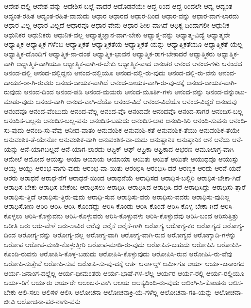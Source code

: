 {ಆದೇಶ-ದಲ್ಲಿ
ಆದೇಶ-ವನ್ನು
ಆದೇಶಿಸ-ಬಲ್ಲೆ-ವಾದರೆ
ಆದೊಡನೆಯೇ
ಆದ್ದ-ರಿಂದ
ಆದ್ದ-ರಿಂದಲೇ
ಆದ್ಯ
ಆದ್ಯಂತ
ಆದ್ಯಂತ-ರಹಿತ
ಆದ್ಯಂತ-ರಹಿತ-ವಾದುದು
ಆಧಾರ
ಆಧಾರದ
ಆಧಾರ-ದಿಂದ
ಆಧಾರ-ವನ್ನು
ಆಧಾರ-ವಾಗ-ಲಾರದು
ಆಧಾರ-ವಿಲ್ಲ
ಆಧಾರ-ವಿಲ್ಲದೆ
ಆಧಾರವೂ
ಆಧಾರ-ವೇನು
ಆಧಾರ-ಶೀಲ-ವಾಗಿದೆ
ಆಧಿಕ್ಯ-ದಿಂದಾಗಲೀ
ಆಧುನಿಕ
ಆಧುನಿಕರ
ಆಧುನಿಕರು
ಆಧುನಿಕ-ವಲ್ಲ
ಆಧ್ಯಾತ್ಮಜ್ಞಾನ-ವಾಗ-ಬೇಕು
ಆಧ್ಯಾತ್ಮ-ವನ್ನು
ಆಧ್ಯಾತ್ಮ-ವಿದ್ಯೆ
ಆಧ್ಯಾತ್ಮವೇ
ಆಧ್ಯಾತ್ಮಿಕ
ಆಧ್ಯಾತ್ಮಿಕ-ಗಳೆಂಬ
ಆಧ್ಯಾತ್ಮಿಕತೆ
ಆಧ್ಯಾತ್ಮಿಕತೆಯ
ಆಧ್ಯಾತ್ಮಿಕತೆ-ಯನ್ನು
ಆಧ್ಯಾತ್ಮಿಕತೆಯೂ
ಆಧ್ಯಾತ್ಮಿಕತೆ-ಯೆಲ್ಲ
ಆಧ್ಯಾತ್ಮಿಕ-ದೊಂದಿಗೆ
ಆಧ್ಯಾತ್ಮಿಕ-ನಾ-ದಂತೆ
ಆಧ್ಯಾತ್ಮಿಕ-ಭಾವನೆ
ಆಧ್ಯಾತ್ಮಿಕ-ರಾಗ-ಬೇಕಾದರೆ
ಆಧ್ಯಾತ್ಮಿಕರು
ಆಧ್ಯಾತ್ಮಿಕ-ವಾಗಿ
ಆಧ್ಯಾತ್ಮಿಕ-ವಾಗಿಯೂ
ಆಧ್ಯಾತ್ಮಿಕ-ವಾಗಿ-ರ-ಬೇಕು
ಆಧ್ಯಾತ್ಮಿಕ-ವಾದ
ಆನಂತರ
ಆನಂದ
ಆನಂದ-ಗಳು
ಆನಂದದ
ಆನಂದ-ದಲ್ಲಿ
ಆನಂದ-ದಲ್ಲಿದ್ದನು
ಆನಂದ-ದಲ್ಲಿಯೂ
ಆನಂದ-ದಲ್ಲಿ-ರು-ವುದು
ಆನಂದ-ದಲ್ಲಿ-ರು-ವೆನು
ಆನಂದ-ದಾಯಕ-ರಾ-ಗಿ-ರುವರು
ಆನಂದ-ದಾಯಕ-ವಾಗಿದೆ
ಆನಂದ-ದಾಯಕ-ವಾಗಿ-ರು-ವು-ದಕ್ಕೆ
ಆನಂದ-ದಾಯಕ-ವಾಗಿ-ರುವುದು
ಆನಂದ-ದಿಂದ
ಆನಂದ-ಪಡಿ
ಆನಂದ-ಮಯರು
ಆನಂದ-ಮೂರ್ತಿ-ಗಳು
ಆನಂದ-ವನ್ನು
ಆನಂದ-ವನ್ನುಂಟು-ಮಾಡು-ವುದು
ಆನಂದ-ವಾಗಿ
ಆನಂದ-ವಾಗಿ-ದೆಯೊ
ಆನಂದ-ವಿದೆ
ಆನಂದ-ವಿದೆಯೊ
ಆನಂದ-ವಿದ್ದರೆ
ಆನಂದವು
ಆನಂದವೂ
ಆನಂದ-ವೆಂಬುದು
ಆನಂದ-ವೆಲ್ಲ
ಆನಂದ-ವೊ
ಆನಂದವೇ
ಆನಂದವೊ
ಆನಂದ-ಸಾಗರ
ಆನಂದಿಸ-ಬಲ್ಲ
ಆನಂದಿಸ-ಬಲ್ಲನು
ಆನಂದಿಸ-ಬಲ್ಲ-ವನು
ಆನಂದಿಸ-ಬಹುದು
ಆನಂದಿಸ-ಲಾರ
ಆನಂದಿ-ಸಿರಿ
ಆನಂದಿ-ಸುವನು
ಆನಂದಿ-ಸು-ವುದು
ಆನಂದಿ-ಸು-ವೆವು
ಆನೀದ-ವಾತಂ
ಆನುವಂಶಿಕ
ಆನುವಂಶಿ-ಕತೆ
ಆನುವಂಶಿಕ-ತೆಯು
ಆನುವಂಶಿಕ-ತೆಯೇ
ಆನುವಂಶಿಕ-ತೆ-ಯೇನೋ
ಆನುವಂಶಿಕ-ವಾಗಿ
ಆನುವಂಶಿಕ-ವಾ-ದುದು
ಆನುಷ್ಟಾನಿಕ
ಆನುಷ್ಠಾನಿಕ
ಆನೆ
ಆನೆಯ
ಆನೆ-ಯನ್ನು
ಆನೆ-ಯಾಗಬಲ್ಲದೆ
ಆನೆ-ಯಾಗ-ಲಾರದು
ಆಪ್ಟಿಕ್
ಆಫ್
ಆಫ್ರಿಕಾ
ಆಫ್ರಿಕಾದ
ಆಭರಣ
ಆಮೂಲಾಗ್ರ-ವಾಗಿ
ಆಮೇಲೆ
ಆಮೋದ
ಆಯಸ್ಸು
ಆಯಾ
ಆಯಾಯ
ಆಯಾಯಾ
ಆಯಿತು
ಆಯಿತೆ
ಆಯಿತೇ
ಆಯುಧವೂ
ಆಯುಸ್ಸು
ಆಯ್ದ
ಆಯ್ದು
ಆರಂಭ-ವಾಗು-ವುದು
ಆರಂಭ-ವಾ-ಯಿತು
ಆರಂಭಿಸಿ
ಆರಂಭಿಸಿ-ದರೆ
ಆರಣ್ಯಕ
ಆರದು
ಆರನೆ-ಯದೆ
ಆರರು
ಆರಾಧನೆ
ಆರಾಧ-ನೆಗೆ
ಆರಾಧನೆ-ಯಿಂದ
ಆರಾಧನೆಯೆ
ಆರಾಧಿಸದ
ಆರಾಧಿಸ-ಬಲ್ಲಿರಿ
ಆರಾಧಿಸ-ಬೇಕಾ-ಗಿದೆ
ಆರಾಧಿಸ-ಬೇಕು
ಆರಾಧಿಸ-ಬೇಕೆಂಬ
ಆರಾಧಿಸಲು
ಆರಾಧಿಸಿ
ಆರಾಧಿಸಿದ
ಆರಾಧಿಸಿ-ದರೆ
ಆರಾಧಿಸಿದ್ದು
ಆರಾಧಿಸು-ತ್ತಾರೆ
ಆರಾಧಿಸು-ತ್ತಿದೆ
ಆರಾಧಿಸು-ತ್ತಿರು-ವುದು
ಆರಾಧಿ-ಸುವ
ಆರಾಧಿಸು-ವರು
ಆರಾಧಿಸು-ವವರು
ಆರಾಧಿಸು-ವುದಿಲ್ಲ
ಆರಾಧಿಸೋಣ
ಆರಿರಿ
ಆರಿಸಿ
ಆರಿಸಿ-ಕೊಂಡದ್ದು
ಆರಿಸಿ-ಕೊಂಡು
ಆರಿಸಿ-ಕೊಂಡೆ
ಆರಿಸಿ-ಕೊಳ್ಳ-ಬೇಕಾ-ಗಿದೆ
ಆರಿಸಿ-ಕೊಳ್ಳಲು
ಆರಿಸಿ-ಕೊಳ್ಳುವನು
ಆರಿಸಿ-ಕೊಳ್ಳುವರು
ಆರಿಸಿ-ಕೊಳ್ಳುವಳು
ಆರಿಸಿ-ಕೊಳ್ಳುವೆವು
ಆರಿಸಿ-ಬಂದ
ಆರಿಸುತ್ತಿತ್ತು
ಆರೀತಿ
ಆರು
ಆರು-ವೇಳೆ
ಆರು-ಸಾವಿರ
ಆರೆವು
ಆರೈಕೆ
ಆರೈಕೆ-ಗಾಗಿ
ಆರೋಗ್ಯ
ಆರೋಗ್ಯ-ಕರ
ಆರೋಗ್ಯದ
ಆರೋಗ್ಯ-ದಿಂದ
ಆರೋಗ್ಯ-ವನ್ನು
ಆರೋಗ್ಯ-ವಲ್ಲ
ಆರೋಗ್ಯ-ವಾಗಿ
ಆರೋಗ್ಯ-ವಾಗಿ-ರುವ
ಆರೋಗ್ಯವೆ
ಆರೋಗ್ಯಾದಿ-ಗಳನ್ನು
ಆರೋಪ
ಆರೋಪ-ಮಾಡಿ-ಕೊಳ್ಳುತ್ತೀರಿ
ಆರೋಪ-ಮಾಡಿ-ರು-ವುದು
ಆರೋಪಿಸ-ಬಹುದು
ಆರೋಪಿಸಿ
ಆರೋಪಿಸಿ-ಕೊಂಡಿ-ರುವನು
ಆರೋಪಿಸಿ-ಕೊಳ್ಳ-ಬಹುದು
ಆರೋಪಿಸಿ-ಕೊಳ್ಳುವುದು
ಆರೋಪಿಸಿ-ರುವ
ಆರೋಪಿಸಿ-ರು-ವೆವು
ಆರೋಪಿ-ಸುತ್ತೇವೆ
ಆರೋಪಿ-ಸುವ
ಆರೋಪಿ-ಸು-ವು-ದಕ್ಕೆ
ಆರ್ತ
ಆರ್ನಾಲ್ಡ್
ಆರ್ಮಿಗೂ
ಆರ್ಯ
ಆರ್ಯ-ಜನಾಂಗದ
ಆರ್ಯ-ಜನಾಂಗ-ದಲ್ಲೆಲ್ಲ
ಆರ್ಯ-ಧೀಮಂತರು
ಆರ್ಯ-ಭಾಷೆ-ಗಳ-ಲೆಲ್ಲ
ಆರ್ಯರ
ಆರ್ಯ-ರಲ್ಲಿ
ಆರ್ಯ-ರಲ್ಲಿಯೂ
ಆರ್ಯ-ರಿಗೆ
ಆರ್ಯರು
ಆರ್ಯರೇ
ಆಲಂಬನ-ವಾಗಿ
ಆಲಯ
ಆಲಸ್ಯದಿಂದಿ-ರು-ವುದು
ಆಲಿಂಗಿ-ಸಿ-ಕೊಂಡನು
ಆಲಿಸ-ಬೇಕು
ಆಲಿ-ಸಲು
ಆಲಿಸಳ
ಆಲಿಸಿ
ಆಲೋಚನಾ
ಆಲೋಚನಾಕ್ರಿ-ಯೆ-ಗಳೆಲ್ಲ
ಆಲೋಚನಾ-ಗತಿ-ಯನ್ನು
ಆಲೋಚನಾ-ಜೀವಿ
ಆಲೋಚನಾ-ಪರ-ನಾಗು-ವನು
}
